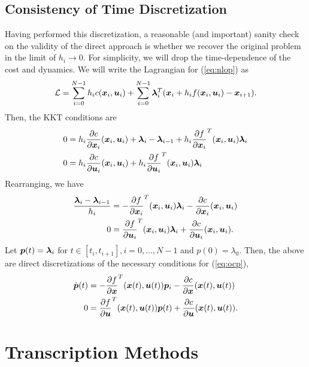 \subsection{Consistency of Time Discretization}

Having performed this discretization, a reasonable (and important) sanity check on the validity of the direct approach is whether we recover the original problem in the limit of $h_i \to 0$. For simplicity, we will drop the time-dependence of the cost and dynamics. We will write the Lagrangian for (\ref{eq:nlop}) as 
\begin{equation}
    \mathcal{L} = \sum_{i=0}^{N-1} h_i c(\bm{x}_i,\bm{u}_i) + \sum_{i=0}^{N-1} \bm{\lambda}_i^T (\bm{x}_i + h_i f(\bm{x}_i,\bm{u}_i) - \bm{x}_{i+1}).
\end{equation}
Then, the KKT conditions are
\begin{align}
    0 &= h_i \frac{\partial c}{\partial \bm{x}_i}(\bm{x}_i,\bm{u}_i) + \bm{\lambda}_i - \bm{\lambda}_{i-1} + h_i \frac{\partial f}{\partial \bm{x}_i}^T(\bm{x}_i,\bm{u}_i) \bm{\lambda}_i\\
    0 &= h_i \frac{\partial c}{\partial \bm{u}_i}(\bm{x}_i,\bm{u}_i) + h_i \frac{\partial f}{\partial \bm{u}_i}^T(\bm{x}_i,\bm{u}_i) \bm{\lambda}_i
\end{align}
Rearranging, we have
\begin{align}
    \frac{\bm{\lambda}_i - \bm{\lambda}_{i-1}}{h_i} &=- \frac{\partial f}{\partial \bm{x}_i}^T(\bm{x}_i,\bm{u}_i) \bm{\lambda}_i- \frac{\partial c}{\partial \bm{x}_i}(\bm{x}_i,\bm{u}_i)\\
    0 &= \frac{\partial f}{\partial \bm{u}_i}^T(\bm{x}_i,\bm{u}_i) \bm{\lambda}_i + \frac{\partial c}{\partial \bm{u}_i}(\bm{x}_i,\bm{u}_i).
\end{align}
Let $\bm{p}(t) = \bm{\lambda}_i$ for $t \in [t_i, t_{i+1}], i = 0, \ldots, N-1$ and $p(0) = \lambda_0$. Then, the above are direct discretizations of the necessary conditions for (\ref{eq:ocp}), 
\begin{align}
    \dot{\bm{p}}(t) &=- \frac{\partial f}{\partial \bm{x}}^T(\bm{x}(t),\bm{u}(t)) \bm{p}_i- \frac{\partial c}{\partial \bm{x}}(\bm{x}(t),\bm{u}(t))\\
    0 &= \frac{\partial f}{\partial \bm{u}}^T(\bm{x}(t),\bm{u}(t)) \bm{p}(t) + \frac{\partial c}{\partial \bm{u}}(\bm{x}(t),\bm{u}(t)).
\end{align}

\section{Transcription Methods}

